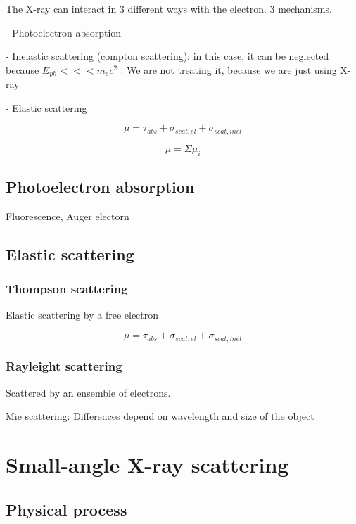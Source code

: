 The X-ray can interact in 3 different ways with the electron. 3 mechanisms.

- Photoelectron absorption

- Inelastic scattering (compton scattering): in this case, it can be neglected because $E_{ph}<<< m_ec^2$ . We are not treating it, because we are just using X-ray

- Elastic scattering

\begin{equation}
        \mu = \tau_{abs}+\sigma_{scat, el}+\sigma_{scat, inel}
\end{equation}

\begin{equation}
        \mu = \Sigma \mu_i
\end{equation}

\subsection{Photoelectron absorption}

Fluorescence, Auger electorn

\subsection{Elastic scattering}

\subsubsection{Thompson scattering}
Elastic scattering by a free electron

\begin{equation}
        \mu = \tau_{abs}+\sigma_{scat, el}+\sigma_{scat, inel}
\end{equation}

\subsubsection{Rayleight scattering}
Scattered by an ensemble of electrons.

Mie scattering: Differences depend on wavelength and size of the object

\section{Small-angle X-ray scattering}
\subsection{Physical process}
